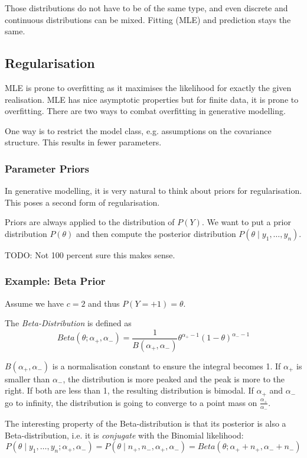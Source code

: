 Those distributions do not have to be
of the same type,
and even discrete and continuous distributions
can be mixed.
Fitting (MLE) and prediction stays the same.


\subsection{Regularisation}
MLE is prone to overfitting as it maximises the likelihood
for exactly the given realisation.
MLE has nice asymptotic properties
but for finite data, it is prone to overfitting.
There are two ways to combat overfitting in
generative modelling.

One way is to restrict the model class,
e.g. assumptions on the covariance structure.
This results in fewer parameters.

\subsubsection{Parameter Priors}
In generative modelling,
it is very natural to think about priors
for regularisation.
This poses a second form of regularisation.

Priors are always applied to the distribution of $P(Y)$.
We want to put a prior distribution $P(\theta)$
and then compute the posterior distribution
$P(\theta \mid y_1, \dotsc, y_n)$.

TODO: Not 100 percent sure this makes sense.

\subsubsection{Example: Beta Prior}
Assume we have $c = 2$ and thus
$P(Y = +1) = \theta$.

The \emph{Beta-Distribution} is defined as
\begin{equation*}
Beta(\theta; \alpha_+, \alpha_-) =
\frac{1}{B(\alpha_+, \alpha_-)}
\theta^{\alpha_+ - 1}
(1 - \theta)^{\alpha_- - 1}
\end{equation*}

$B(\alpha_+, \alpha_-)$ is
a normalisation constant to
ensure the integral becomes 1.
If $\alpha_+$ is smaller than $\alpha_-$,
the distribution is more peaked and the
peak is more to the right.
If both are less than 1,
the resulting distribution is bimodal.
If $\alpha_+$ and $\alpha_-$ go to infinity,
the distribution is going to converge to a point mass
on $\frac{\alpha_+}{\alpha_-}$.

The interesting property of the Beta-distribution
is that its posterior
is also a Beta-distribution,
i.e. it is \emph{conjugate} with the Binomial likelihood:
\begin{equation*}
P(\theta \mid y_1, \dotsc, y_n; \alpha_+, \alpha_-)
= P(\theta \mid n_+, n_-, \alpha_+, \alpha_-)
= Beta(\theta; \alpha_+ + n_+, \alpha_- + n_-)
\end{equation*}

